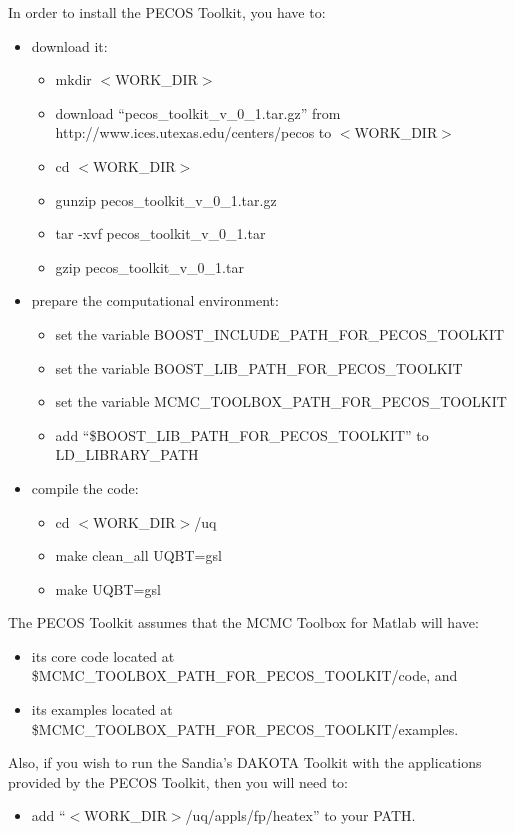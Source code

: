 In order to install the PECOS Toolkit, you have to:
\begin{itemize}
\item {download it:
\begin{itemize}
\item mkdir $<$WORK\_DIR$>$
\item download ``pecos\_toolkit\_v\_0\_1.tar.gz'' from http://www.ices.utexas.edu/centers/pecos to $<$WORK\_DIR$>$
\item cd $<$WORK\_DIR$>$
\item gunzip pecos\_toolkit\_v\_0\_1.tar.gz
\item tar -xvf pecos\_toolkit\_v\_0\_1.tar
\item gzip pecos\_toolkit\_v\_0\_1.tar
\end{itemize}
}
\item {prepare the computational environment:
\begin{itemize}
\item set the variable BOOST\_INCLUDE\_PATH\_FOR\_PECOS\_TOOLKIT
\item set the variable BOOST\_LIB\_PATH\_FOR\_PECOS\_TOOLKIT
\item set the variable MCMC\_TOOLBOX\_PATH\_FOR\_PECOS\_TOOLKIT
\item add ``\$BOOST\_LIB\_PATH\_FOR\_PECOS\_TOOLKIT'' to LD\_LIBRARY\_PATH
\end{itemize}
}
\item {compile the code:
\begin{itemize}
\item cd $<$WORK\_DIR$>$/uq
\item make clean\_all UQBT=gsl
\item make UQBT=gsl
\end{itemize}
}
\end{itemize}
The PECOS Toolkit assumes that the MCMC Toolbox for Matlab will have:
\begin{itemize}
\item its core code located at \$MCMC\_TOOLBOX\_PATH\_FOR\_PECOS\_TOOLKIT/code, and
\item its examples located at \$MCMC\_TOOLBOX\_PATH\_FOR\_PECOS\_TOOLKIT/examples.
\end{itemize}
Also, if you wish to run the Sandia's DAKOTA Toolkit \cite{dakota} with the applications provided by the PECOS Toolkit, then you will need to:
\begin{itemize}
\item add ``$<$WORK\_DIR$>$/uq/appls/fp/heatex'' to your PATH.
\end{itemize}


